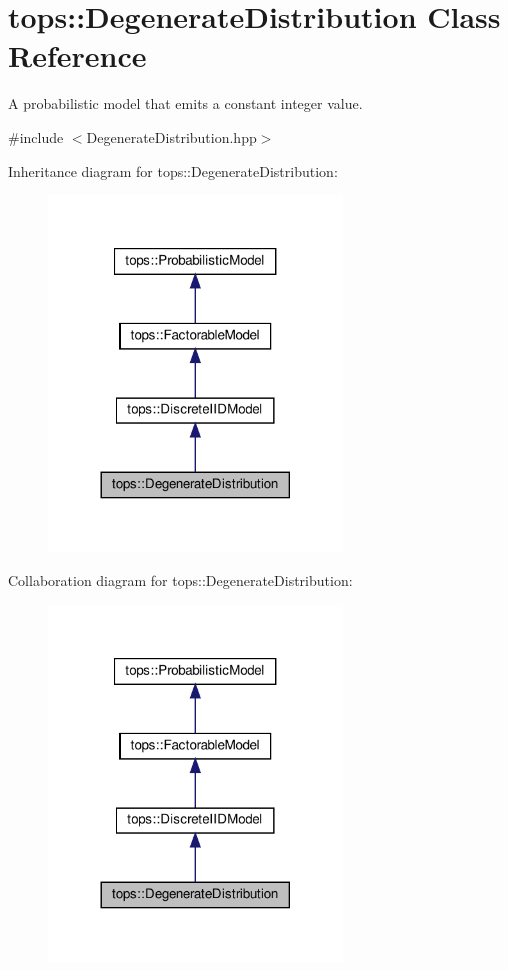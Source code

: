 \hypertarget{classtops_1_1DegenerateDistribution}{}\section{tops\+:\+:Degenerate\+Distribution Class Reference}
\label{classtops_1_1DegenerateDistribution}


A probabilistic model that emits a constant integer value.  




{\ttfamily \#include $<$Degenerate\+Distribution.\+hpp$>$}



Inheritance diagram for tops\+:\+:Degenerate\+Distribution\+:
\nopagebreak
\begin{figure}[H]
\begin{center}
\leavevmode
\includegraphics[width=221pt]{classtops_1_1DegenerateDistribution__inherit__graph}
\end{center}
\end{figure}


Collaboration diagram for tops\+:\+:Degenerate\+Distribution\+:
\nopagebreak
\begin{figure}[H]
\begin{center}
\leavevmode
\includegraphics[width=221pt]{classtops_1_1DegenerateDistribution__coll__graph}
\end{center}
\end{figure}
